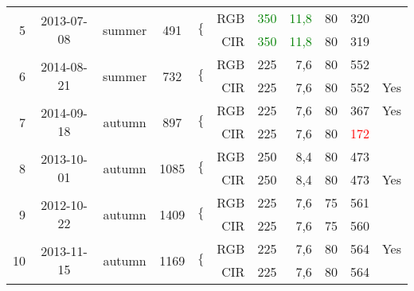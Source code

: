 \documentclass[remotesensing,article,submit,moreauthors,pdftex,12pt,a4paper]{mdpi} %
\begin{document}
\begin{table}[htbp]
{\begin{tabular}{rrrrrrrrrrr}
  \multirow{2}{*}{5}     & \multicolumn{1}{c}{\multirow{2}[0]{*}{2013-07-08}} & \multicolumn{1}{c}{\multirow{2}[0]{*}{summer}} & \multicolumn{1}{c}{\multirow{2}[0]{*}{491}} & \multirow{2}{*}{\Large{$\{$}}  & RGB   & \textcolor{green}{350}   & \textcolor{green}{11,8}  & 80    & 320   &  \\
 &    &  &  &  & CIR   & \textcolor{green}{350}   & \textcolor{green}{11,8}  & 80    & 319   &  \\
 \multirow{2}{*}{6}   & \multicolumn{1}{c}{\multirow{2}[0]{*}{2014-08-21}} & \multicolumn{1}{c}{\multirow{2}[0]{*}{summer}} & \multicolumn{1}{c}{\multirow{2}[0]{*}{732}} &  \multirow{2}{*}{\Large{$\{$}}   & RGB   & 225   & 7,6   & 80    & 552   &  \\
 &   &   &  &  & CIR   & 225   & 7,6   & 80    & 552   & Yes \\
 \multirow{2}{*}{7}     & \multicolumn{1}{c}{\multirow{2}[0]{*}{2014-09-18}} & \multicolumn{1}{c}{\multirow{2}[0]{*}{autumn}} & \multicolumn{1}{c}{\multirow{2}[0]{*}{897}} & \multirow{2}{*}{\Large{$\{$}} & RGB   & 225   & 7,6   & 80    &    367   &  Yes \\
 &  &    &  &  & CIR   & 225   & 7,6   & 80    &   \textcolor{red}{172}    &   \\
\multirow{2}{*}{8}    & \multicolumn{1}{c}{\multirow{2}[0]{*}{2013-10-01}} & \multicolumn{1}{c}{\multirow{2}[0]{*}{autumn}} & \multicolumn{1}{c}{\multirow{2}[0]{*}{1085}} & \multirow{2}{*}{\Large{$\{$}} & RGB   & 250   & 8,4   & 80    & 473   &  \\
 &   &   &  &  & CIR   & 250   & 8,4   & 80    & 473   & Yes \\
\multirow{2}{*}{9}    & \multicolumn{1}{c}{\multirow{2}[0]{*}{2012-10-22}} & \multicolumn{1}{c}{\multirow{2}[0]{*}{autumn}} &  \multicolumn{1}{c}{\multirow{2}[0]{*}{1409}} &  \multirow{2}{*}{\Large{$\{$}} & RGB   & 225   & 7,6   & 75    & 561   &  \\
 &   &   &  &  & CIR   & 225   & 7,6   & 75    & 560   &  \\
\multirow{2}{*}{10}     & \multicolumn{1}{c}{\multirow{2}[0]{*}{2013-11-15}} & \multicolumn{1}{c}{\multirow{2}[0]{*}{autumn}} & \multicolumn{1}{c}{\multirow{2}[0]{*}{1169}} & \multirow{2}{*}{\Large{$\{$}} & RGB   & 225   & 7,6   & 80    & 564   & Yes \\
 &  &   &  &  & CIR   & 225   & 7,6   & 80    & 564   &  \\
     \hline
    \end{tabular}}
  \label{tab:TS}
\end{table}
\end{document}
